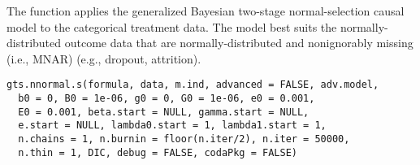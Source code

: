 \documentclass[a4paper]{book}
\begin{document}
%
\begin{Description}\relax
The  function applies the generalized Bayesian two-stage
normal-selection causal model to the categorical treatment data.
The model best suits the normally-distributed outcome data that are normally-distributed
and nonignorably missing (i.e., MNAR) (e.g., dropout, attrition).
\end{Description}
%
\begin{Usage}
\begin{verbatim}
gts.nnormal.s(formula, data, m.ind, advanced = FALSE, adv.model,
  b0 = 0, B0 = 1e-06, g0 = 0, G0 = 1e-06, e0 = 0.001,
  E0 = 0.001, beta.start = NULL, gamma.start = NULL,
  e.start = NULL, lambda0.start = 1, lambda1.start = 1,
  n.chains = 1, n.burnin = floor(n.iter/2), n.iter = 50000,
  n.thin = 1, DIC, debug = FALSE, codaPkg = FALSE)
\end{verbatim}
\end{Usage}
%
\end{document}
